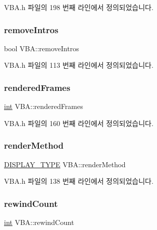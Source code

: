 V\+B\+A.\+h 파일의 198 번째 라인에서 정의되었습니다.

\mbox{\label{class_v_b_a_a6554de6c629baaf1567d4c3ed9f99e95}} 
\subsubsection{\texorpdfstring{remove\+Intros}{removeIntros}}
{\footnotesize\ttfamily bool V\+B\+A\+::remove\+Intros}



V\+B\+A.\+h 파일의 113 번째 라인에서 정의되었습니다.

\mbox{\label{class_v_b_a_a05df4a540441a0a8862376af6a2fc57b}} 
\subsubsection{\texorpdfstring{rendered\+Frames}{renderedFrames}}
{\footnotesize\ttfamily \mbox{\hyperlink{_util_8cpp_a0ef32aa8672df19503a49fab2d0c8071}{int}} V\+B\+A\+::rendered\+Frames}



V\+B\+A.\+h 파일의 160 번째 라인에서 정의되었습니다.

\mbox{\label{class_v_b_a_ae31026d8986a7658f3aaa46fba9de663}} 
\subsubsection{\texorpdfstring{render\+Method}{renderMethod}}
{\footnotesize\ttfamily \mbox{\hyperlink{_display_8h_aa50f63b0688d0250e0be64d8401d09a0}{D\+I\+S\+P\+L\+A\+Y\+\_\+\+T\+Y\+PE}} V\+B\+A\+::render\+Method}



V\+B\+A.\+h 파일의 138 번째 라인에서 정의되었습니다.

\mbox{\label{class_v_b_a_a39430ba84d3e7205846e24f0484d7880}} 
\subsubsection{\texorpdfstring{rewind\+Count}{rewindCount}}
{\footnotesize\ttfamily \mbox{\hyperlink{_util_8cpp_a0ef32aa8672df19503a49fab2d0c8071}{int}} V\+B\+A\+::rewind\+Count}



